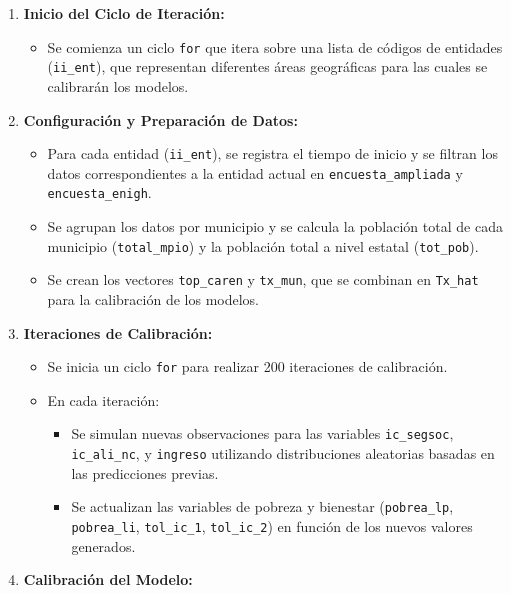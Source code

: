 \documentclass[
  12pt,
]{book}
\providecommand{\tightlist}{%
  \setlength{\itemsep}{0pt}\setlength{\parskip}{0pt}}
\begin{document}
\begin{enumerate}
\def\labelenumi{\arabic{enumi}.}
\tightlist
\item
  \textbf{Inicio del Ciclo de Iteración:}

  \begin{itemize}
  \tightlist
  \item
    Se comienza un ciclo \texttt{for} que itera sobre una lista de códigos de entidades (\texttt{ii\_ent}), que representan diferentes áreas geográficas para las cuales se calibrarán los modelos.
  \end{itemize}
\item
  \textbf{Configuración y Preparación de Datos:}

  \begin{itemize}
  \tightlist
  \item
    Para cada entidad (\texttt{ii\_ent}), se registra el tiempo de inicio y se filtran los datos correspondientes a la entidad actual en \texttt{encuesta\_ampliada} y \texttt{encuesta\_enigh}.
  \item
    Se agrupan los datos por municipio y se calcula la población total de cada municipio (\texttt{total\_mpio}) y la población total a nivel estatal (\texttt{tot\_pob}).
  \item
    Se crean los vectores \texttt{top\_caren} y \texttt{tx\_mun}, que se combinan en \texttt{Tx\_hat} para la calibración de los modelos.
  \end{itemize}
\item
  \textbf{Iteraciones de Calibración:}

  \begin{itemize}
  \tightlist
  \item
    Se inicia un ciclo \texttt{for} para realizar 200 iteraciones de calibración.
  \item
    En cada iteración:

    \begin{itemize}
    \tightlist
    \item
      Se simulan nuevas observaciones para las variables \texttt{ic\_segsoc}, \texttt{ic\_ali\_nc}, y \texttt{ingreso} utilizando distribuciones aleatorias basadas en las predicciones previas.
    \item
      Se actualizan las variables de pobreza y bienestar (\texttt{pobrea\_lp}, \texttt{pobrea\_li}, \texttt{tol\_ic\_1}, \texttt{tol\_ic\_2}) en función de los nuevos valores generados.
    \end{itemize}
  \end{itemize}
\item
  \textbf{Calibración del Modelo:}


\end{enumerate}
\end{document}
